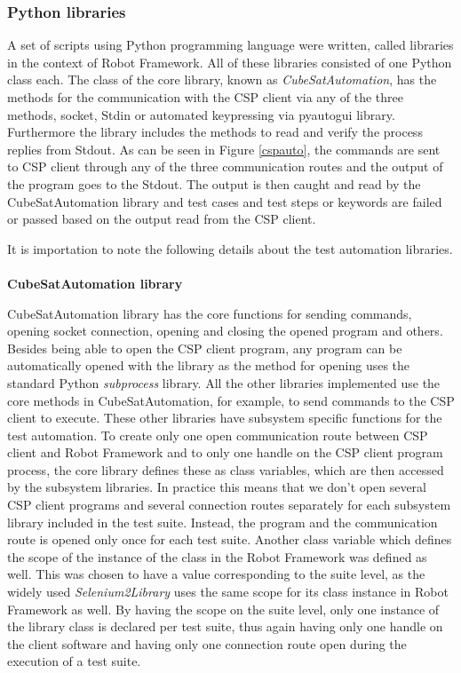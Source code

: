 \documentclass[english,12pt,a4paper,pdftex,elec,utf8]{aaltothesis}
\begin{document}
\subsubsection{Python libraries}
A set of scripts using Python programming language were written, called
libraries in the context of Robot Framework. All of these libraries consisted of one Python class each. The class of the core library, known as \textit{CubeSatAutomation}, has the methods for the communication with the CSP client via any of the three methods, socket, Stdin or automated keypressing via pyautogui library. Furthermore the library includes the methods to read and verify the process replies from Stdout.
As can be seen in Figure \ref{cspauto}, the commands are sent to CSP client through any of the three communication routes and the output of the program goes to the Stdout. The output is then caught and read by the CubeSatAutomation library and test cases and test steps or keywords are failed or passed based on the output read from the CSP client. \par
It is importation to note the following details about the test automation libraries. 
\\
\\
\textbf{CubeSatAutomation library}\par
CubeSatAutomation library has the core functions for sending commands, opening socket connection, opening and closing the opened program and others. Besides being able to open the CSP client program, any program can be automatically opened with the library as the method for opening uses the standard Python \textit{subprocess} library. All the other libraries implemented use the core methods in CubeSatAutomation, for example, to send commands to the CSP client to execute. These other libraries have subsystem specific functions for the test automation. To create only one open communication route between CSP client and Robot Framework and to only one handle on the CSP client program process, the core library defines these as class variables, which are then accessed by the subsystem libraries. In practice this means that we don't open several CSP client programs and several connection routes separately for each subsystem library included in the test suite. Instead, the program and the communication route is opened only once for each test suite. Another class variable which defines the scope of the instance of the class in the Robot Framework was defined as well. This was chosen to have a value corresponding to the suite level, as the widely used \textit{Selenium2Library} uses the same scope for its class instance in Robot Framework as well. By having the scope on the suite level, only one instance of the library class is declared per test suite, thus again having only one handle on the client software and having only one connection route open during the execution of a test suite.\par 
\end{document}
